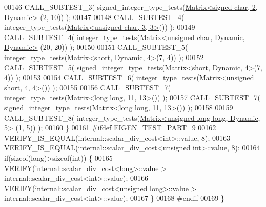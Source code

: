 \begin{DoxyCode}
00146     CALL\_SUBTEST\_3( signed\_integer\_type\_tests(\hyperlink{group___core___module_class_eigen_1_1_matrix}{Matrix<signed char, 2, Dynamic>}
      (2, 10)) );
00147 
00148     CALL\_SUBTEST\_4( integer\_type\_tests(\hyperlink{group___core___module_class_eigen_1_1_matrix}{Matrix<unsigned char, 3, 3>}()) );
00149     CALL\_SUBTEST\_4( integer\_type\_tests(\hyperlink{group___core___module_class_eigen_1_1_matrix}{Matrix<unsigned char, Dynamic, Dynamic>}
      (20, 20)) );
00150 
00151     CALL\_SUBTEST\_5( integer\_type\_tests(\hyperlink{group___core___module_class_eigen_1_1_matrix}{Matrix<short, Dynamic, 4>}(7, 4)) );
00152     CALL\_SUBTEST\_5( signed\_integer\_type\_tests(\hyperlink{group___core___module_class_eigen_1_1_matrix}{Matrix<short, Dynamic, 4>}(7, 4)) );
00153 
00154     CALL\_SUBTEST\_6( integer\_type\_tests(\hyperlink{group___core___module_class_eigen_1_1_matrix}{Matrix<unsigned short, 4, 4>}()) );
00155 
00156     CALL\_SUBTEST\_7( integer\_type\_tests(\hyperlink{group___core___module_class_eigen_1_1_matrix}{Matrix<long long, 11, 13>}()) );
00157     CALL\_SUBTEST\_7( signed\_integer\_type\_tests(\hyperlink{group___core___module_class_eigen_1_1_matrix}{Matrix<long long, 11, 13>}()) );
00158 
00159     CALL\_SUBTEST\_8( integer\_type\_tests(\hyperlink{group___core___module_class_eigen_1_1_matrix}{Matrix<unsigned long long, Dynamic, 5>}
      (1, 5)) );
00160   \}
00161 \textcolor{preprocessor}{#ifdef EIGEN\_TEST\_PART\_9}
00162   VERIFY\_IS\_EQUAL(internal::scalar\_div\_cost<int>::value, 8);
00163   VERIFY\_IS\_EQUAL(internal::scalar\_div\_cost<unsigned int>::value, 8);
00164   \textcolor{keywordflow}{if}(\textcolor{keyword}{sizeof}(\textcolor{keywordtype}{long})>\textcolor{keyword}{sizeof}(\textcolor{keywordtype}{int})) \{
00165     VERIFY(internal::scalar\_div\_cost<long>::value > internal::scalar\_div\_cost<int>::value);
00166     VERIFY(internal::scalar\_div\_cost<unsigned long>::value > internal::scalar\_div\_cost<int>::value);
00167   \}
00168 \textcolor{preprocessor}{#endif}
00169 \}
\end{DoxyCode}
